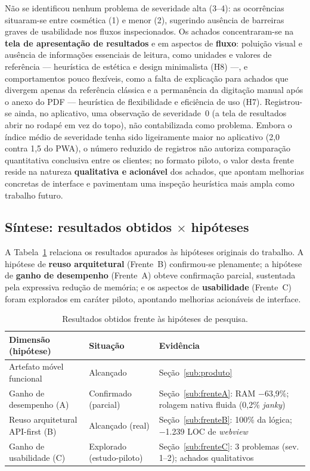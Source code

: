 Não se identificou nenhum problema de severidade alta (3--4): as ocorrências
situaram-se entre cosmética (1) e menor (2), sugerindo ausência de barreiras
graves de usabilidade nos fluxos inspecionados. Os achados concentraram-se na
\textbf{tela de apresentação de resultados} e em aspectos de \textbf{fluxo}:
poluição visual e ausência de informações essenciais de leitura, como unidades e
valores de referência --- heurística de estética e design minimalista (H8) ---, e
comportamentos pouco flexíveis, como a falta de explicação para achados que
divergem apenas da referência clássica e a permanência da digitação manual após o
anexo do PDF --- heurística de flexibilidade e eficiência de uso (H7). Registrou-se
ainda, no aplicativo, uma observação de severidade~0 (a tela de resultados abrir no
rodapé em vez do topo), não contabilizada como problema. Embora o índice médio de
severidade tenha sido ligeiramente maior no aplicativo (2,0 contra 1,5 do PWA), o
número reduzido de registros não autoriza comparação quantitativa conclusiva entre
os clientes; no formato piloto, o valor desta frente reside na natureza
\textbf{qualitativa e acionável} dos achados, que apontam melhorias concretas de
interface e pavimentam uma inspeção heurística mais ampla como trabalho futuro.

\subsection{Síntese: resultados obtidos $\times$ hipóteses}
\label{sub:sintese}

A Tabela~\ref{tab:sintese} relaciona os resultados apurados às hipóteses originais
do trabalho. A hipótese de \textbf{reuso arquitetural} (Frente~B) confirmou-se
plenamente; a hipótese de \textbf{ganho de desempenho} (Frente~A) obteve confirmação
parcial, sustentada pela expressiva redução de memória; e os aspectos de
\textbf{usabilidade} (Frente~C) foram explorados em caráter piloto, apontando
melhorias acionáveis de interface.

\begin{table}[H]
\centering
\caption{Resultados obtidos frente às hipóteses de pesquisa.}
\label{tab:sintese}
\footnotesize
\begin{tabular}{|p{5.6cm}|p{3.0cm}|p{5.0cm}|}
\hline
\textbf{Dimensão (hipótese)} & \textbf{Situação} & \textbf{Evidência} \\ \hline
Artefato móvel funcional & Alcançado & Seção~\ref{sub:produto} \\ \hline
Ganho de desempenho (A) & Confirmado (parcial) & Seção~\ref{sub:frenteA}: RAM $-$63,9\%; rolagem nativa fluida (0,2\% \emph{janky}) \\ \hline
Reuso arquitetural API-first (B) & Alcançado (real) & Seção~\ref{sub:frenteB}: 100\% da lógica; $-$1.239 LOC de \emph{webview} \\ \hline
Ganho de usabilidade (C) & Explorado (estudo-piloto) & Seção~\ref{sub:frenteC}: 3 problemas (sev. 1--2); achados qualitativos \\ \hline
\end{tabular}
\end{table}

